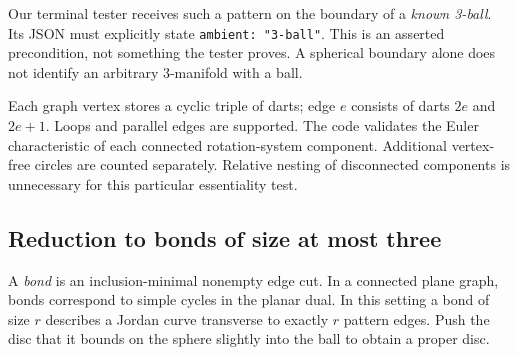 \documentclass[11pt]{article}
\theoremstyle{definition}\newtheorem{definition}[theorem]{Definition}
\begin{document}
Our terminal tester receives such a pattern on the boundary of a \emph{known
3-ball}. Its JSON must explicitly state \texttt{ambient: "3-ball"}.
This is an asserted precondition, not something the tester proves. A spherical
boundary alone does not identify an arbitrary 3-manifold with a ball.

Each graph vertex stores a cyclic triple of darts; edge $e$ consists of darts
$2e$ and $2e+1$. Loops and parallel edges are supported. The code validates the
Euler characteristic of each connected rotation-system component. Additional
vertex-free circles are counted separately. Relative nesting of disconnected
components is unnecessary for this particular essentiality test.

\subsection{Reduction to bonds of size at most three}

A \emph{bond} is an inclusion-minimal nonempty edge cut. In a connected plane
graph, bonds correspond to simple cycles in the planar dual. In this setting
a bond of size $r$ describes a Jordan curve transverse to exactly $r$ pattern
edges. Push the disc that it bounds on the sphere slightly into the ball to
obtain a proper disc.
\end{document}
